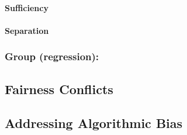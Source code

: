 \documentclass[
]{article}
\begin{document}
\hypertarget{sufficiency}{%
\paragraph{Sufficiency}\label{sufficiency}}

\hypertarget{separation}{%
\paragraph{Separation}\label{separation}}

\hypertarget{group-regression}{%
\subsubsection{Group (regression):}\label{group-regression}}

\hypertarget{fairness-conflicts}{%
\subsection{Fairness Conflicts}\label{fairness-conflicts}}

\hypertarget{addressing-algorithmic-bias}{%
\subsection{Addressing Algorithmic
Bias}\label{addressing-algorithmic-bias}}
\end{document}
